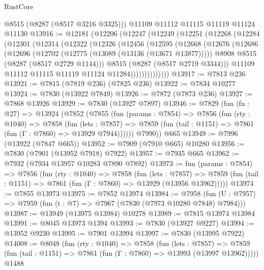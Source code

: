 \begin{lexlean}{RustCore}
\begin{coremodule}
      @8515
      (@8287 (@8517 @3216 @3325)))
    @11109
    @11112
    @11115
    @11119
    @11124
    @11130
@13916 := @12181
    (@12206
      (@12247
        (@12249
          (@12251
            (@12268
              (@12284
                (@12301
                  (@12314
                    (@12322
                      (@12326
                        (@12456
                          (@12595
                            (@12668
                              (@12676
                                (@12686
                                  (@12696
                                    (@12702 (@12775 (@13089 (@13136 (@13671 @13877)))))
                                    @8908
                                    @8515
                                    (@8287 (@8517 @2729 @1144)))
                                  @8515
                                  (@8287 (@8517 @2719 @3344)))
                                @11109
                                @11112
                                @11115
                                @11119
                                @11124
                                @11284))))))))))))))
@13917 := @7813 @236
@13921 := @7815 (@7819 @236) (@7825 @236)
@13922 := @7834 @10277
@13924 := @7830 (@13922 @7849)
@13926 := @7872 (@7873 @236)
@13927 := @7868 @13926
@13929 := @7830 (@13927 @7897)
@13946 := @7829
    (fun (fn : @27) =>
    @13924
      (@7852
        (@7855
          (fun (params : @7854) =>
          @7856
            (fun (rty : @1040) =>
            @7858
              (fun (lets : @7857) =>
              @7859 (fun (tail : @1151) => @7861 (fun (Γ : @7860) => @13929 @7944))))))
        @7990))
    @665
@13949 := @7996 (@13922 (@7847 @665))
@13952 := @7909 (@7910 @665) @10280
@13956 := @7830 (@7901 (@13952 @7918) @7922)
@13957 := @7935 @665
@13962 := @7932 (@7934 @13957 @10283 @7890 @7892)
@13973 := fun (params : @7854) =>
  @7856
    (fun (rty : @1040) =>
    @7858
      (fun (lets : @7857) =>
      @7859 (fun (tail : @1151) => @7861 (fun (Γ : @7860) => @13929 (@13956 @13962)))))
@13974 := @7855 @13973
@13975 := @7852 @13974
@13984 := @7958
    (fun (U : @7957) => @7959 (fun (t : @7) => @7967 (@7830 (@7973 @10280 @7848) @7984)))
@13987 := @13949 (@13975 @13984) @10278
@13989 := @7815 @13974 @13984
@13991 := @8045 @13973 @1394
@13993 := @7830 (@13927 @9227)
@13994 := @13952 @9230
@13995 := @7901 @13994
@13997 := @7830 (@13995 @7922)
@14008 := @8048
    (fun (rty : @1040) =>
    @7858
      (fun (lets : @7857) =>
      @7859 (fun (tail : @1151) => @7861 (fun (Γ : @7860) => @13993 (@13997 @13962)))))
    @1488

\end{coremodule}
\end{lexlean}
